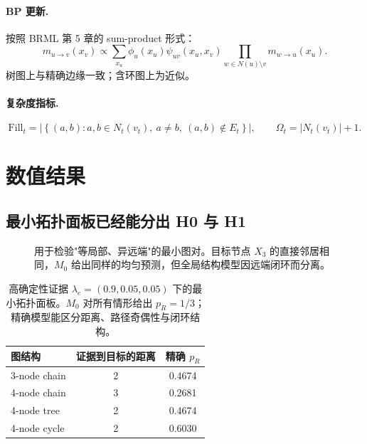 \documentclass[11pt,a4paper]{ctexart}
\begin{document}
\paragraph{BP 更新.}
按照 BRML 第 5 章的 sum-product 形式：
\[
m_{u\to v}(x_v)
\propto
\sum_{x_u}
\phi_u(x_u)\psi_{uv}(x_u,x_v)
\prod_{w\in N(u)\setminus v}m_{w\to u}(x_u).
\]
树图上与精确边缘一致；含环图上为近似。

\paragraph{复杂度指标.}
\[
\mathrm{Fill}_t
=
\left|
\left\{
(a,b): a,b\in N_t(v_t),\ a\neq b,\ (a,b)\notin E_t
\right\}
\right|,
\qquad
\Omega_t = |N_t(v_t)|+1.
\]

\section{数值结果}

\subsection{最小拓扑面板已经能分出 H0 与 H1}

\begin{figure}[ht]
\centering
{}
\caption{用于检验"等局部、异远端"的最小图对。目标节点 $X_3$ 的直接邻居相同，$M_0$ 给出同样的均匀预测，但全局结构模型因远端闭环而分离。}
\end{figure}

\begin{table}[ht]
\centering\small
\begin{tabular}{lcc}
\toprule
图结构 & 证据到目标的距离 & 精确 $p_R$ \\
\midrule
3-node chain & 2 & 0.4674 \\
4-node chain & 3 & 0.2681 \\
4-node tree  & 2 & 0.4674 \\
4-node cycle & 2 & 0.6030 \\
\bottomrule
\end{tabular}
\caption{高确定性证据 $\lambda_e=(0.9,0.05,0.05)$ 下的最小拓扑面板。$M_0$ 对所有情形给出 $p_R=1/3$；精确模型能区分距离、路径奇偶性与闭环结构。}
\end{table}
\end{document}
